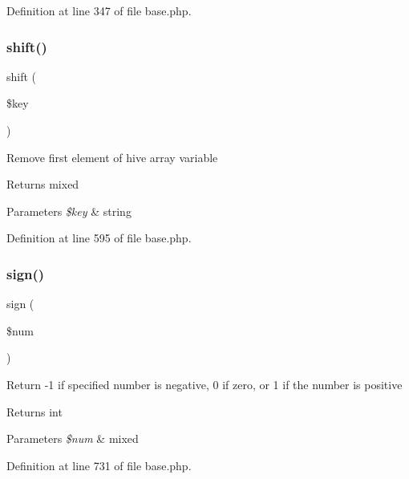 Definition at line 347 of file base.\+php.

\hypertarget{class_base_a4ddb1b90cf267ea505ec59db4c6f5134}{}\label{class_base_a4ddb1b90cf267ea505ec59db4c6f5134} 
\subsubsection{\texorpdfstring{shift()}{shift()}}
{\footnotesize\ttfamily shift (\begin{DoxyParamCaption}\item[{}]{\$key }\end{DoxyParamCaption})}

Remove first element of hive array variable \begin{DoxyReturn}{Returns}
mixed 
\end{DoxyReturn}

\begin{DoxyParams}{Parameters}
{\em \$key} & string \\
\hline
\end{DoxyParams}


Definition at line 595 of file base.\+php.

\hypertarget{class_base_a94648b79713b75bf4b68864e4f916df4}{}\label{class_base_a94648b79713b75bf4b68864e4f916df4} 
\subsubsection{\texorpdfstring{sign()}{sign()}}
{\footnotesize\ttfamily sign (\begin{DoxyParamCaption}\item[{}]{\$num }\end{DoxyParamCaption})}

Return -\/1 if specified number is negative, 0 if zero, or 1 if the number is positive \begin{DoxyReturn}{Returns}
int 
\end{DoxyReturn}

\begin{DoxyParams}{Parameters}
{\em \$num} & mixed \\
\hline
\end{DoxyParams}


Definition at line 731 of file base.\+php.

\hypertarget{class_base_a28e7ef7f4daed47ec1d65760c0a85c27}{}\label{class_base_a28e7ef7f4daed47ec1d65760c0a85c27} 
